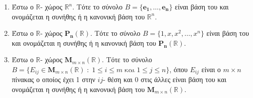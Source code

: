 \begin{examples}
\item {}
  \begin{enumerate}
    \item Έστω ο $ \mathbb{R} $- χώρος $ \mathbb{R}^{n} $. Τότε το σύνολο 
      $ B = \{ \mathbf{e_{1}}, \ldots, \mathbf{e_{n}} \} $ είναι βάση του και 
      ονομάζεται η συνήθης ή η κανονική βάση του $ \mathbb{R}^{n} $.
    \item Έστω ο $ \mathbb{R} $- χώρος $ \mathbf{P_{n}}(\mathbb{R}) $. Τότε το 
      σύνολο $ B = \{ 1, x, x^{2}, \ldots, x^{n} \} $ είναι βάση του και 
      ονομάζεται η συνήθης ή η κανονική βάση του $ \mathbf{P_{n}}(\mathbb{R}) $.
    \item Έστω ο $ \mathbb{R} $- χώρος $ \textbf{M}_{m \times n}(\mathbb{R}) $. 
      Τότε το σύνολο 
      $ B = \{ E_{ij} \in \textbf{M}_{m \times n}(\mathbb{R}) \; : \; 1 \leq i
      \leq m \; \text{και} \; 1 \leq j \leq n\}  $, όπου $ E _{ij} $ είναι ο 
      $ m \times n $ πίνακας ο οποίος έχει 1 στην $ ij $- θέση και 0 στις άλλες 
      είναι βάση του και ονομάζεται η συνήθης ή η κανονική βάση του 
      $ \textbf{M}_{m \times n}(\mathbb{R}) $.
  \end{enumerate}
\end{examples}

